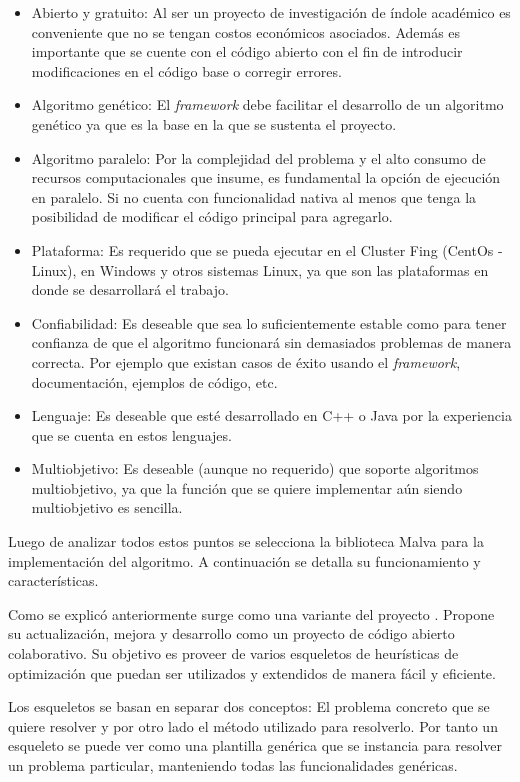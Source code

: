 \begin{itemize}
	\item Abierto y gratuito: Al ser un proyecto de investigación de índole académico es conveniente que no se tengan costos económicos asociados. Además es importante que se cuente con el código abierto con el fin de introducir modificaciones en el código base o corregir errores.
	\item Algoritmo genético: El \emph{framework} debe facilitar el desarrollo de un algoritmo genético ya que es la base en la que se sustenta el proyecto.
	\item Algoritmo paralelo: Por la complejidad del problema y el alto consumo de recursos computacionales que insume, es fundamental la opción de ejecución en paralelo. Si no cuenta con funcionalidad nativa al menos que tenga la posibilidad de modificar el código principal para agregarlo.
	\item Plataforma: Es requerido que se pueda ejecutar en el Cluster Fing (CentOs - Linux), en Windows y otros sistemas Linux, ya que son las plataformas en donde se desarrollará el trabajo.
	\item Confiabilidad: Es deseable que sea lo suficientemente estable como para tener confianza de que el algoritmo funcionará sin demasiados problemas de manera correcta. Por ejemplo que existan casos de éxito usando el \emph{framework}, documentación, ejemplos de código, etc.
	\item Lenguaje: Es deseable que esté desarrollado en C++ o Java por la experiencia que se cuenta en estos lenguajes. 
	\item Multiobjetivo: Es deseable (aunque no requerido) que soporte algoritmos multiobjetivo, ya que la función que se quiere implementar aún siendo multiobjetivo es sencilla.	
\end{itemize} 

Luego de analizar todos estos puntos se selecciona la biblioteca Malva para la implementación del algoritmo. A continuación se detalla su funcionamiento y características.

Como se explicó anteriormente \citet{Malva} surge como una variante del proyecto \citet{Mallba}. Propone su actualización, mejora y desarrollo como un proyecto de código abierto colaborativo.  Su objetivo es proveer de varios esqueletos de heurísticas de optimización que puedan ser utilizados y extendidos de manera fácil y eficiente.

Los esqueletos se basan en separar dos conceptos: El problema concreto que se quiere resolver y por otro lado el método utilizado para resolverlo. Por tanto un esqueleto se puede ver como una plantilla genérica que se instancia para resolver un problema particular, manteniendo todas las funcionalidades genéricas.

